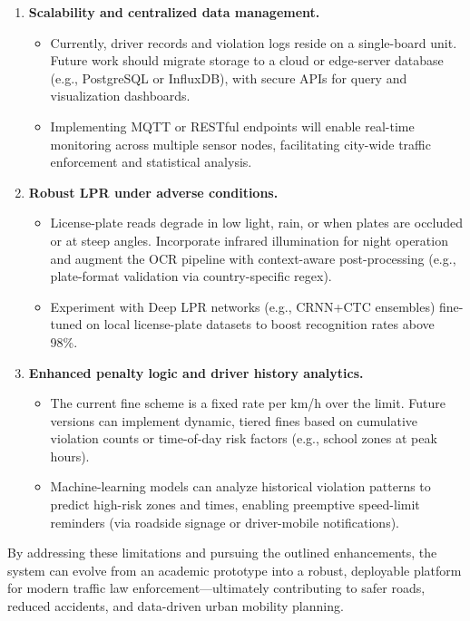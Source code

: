 \begin{enumerate}
  \item \textbf{Scalability and centralized data management.}
  \begin{itemize}
    \item Currently, driver records and violation logs reside on a single-board unit. Future work should migrate storage to a cloud or edge-server database (e.g., PostgreSQL or InfluxDB), with secure APIs for query and visualization dashboards.
    \item Implementing MQTT or RESTful endpoints will enable real-time monitoring across multiple sensor nodes, facilitating city-wide traffic enforcement and statistical analysis.
  \end{itemize}
  
  \item \textbf{Robust LPR under adverse conditions.}
  \begin{itemize}
    \item License-plate reads degrade in low light, rain, or when plates are occluded or at steep angles. Incorporate infrared illumination for night operation and augment the OCR pipeline with context-aware post-processing (e.g., plate-format validation via country-specific regex).
    \item Experiment with Deep LPR networks (e.g., CRNN+CTC ensembles) fine-tuned on local license-plate datasets to boost recognition rates above 98\%.
  \end{itemize}
  
  \item \textbf{Enhanced penalty logic and driver history analytics.}
  \begin{itemize}
    \item The current fine scheme is a fixed rate per km/h over the limit. Future versions can implement dynamic, tiered fines based on cumulative violation counts or time-of-day risk factors (e.g., school zones at peak hours).
    \item Machine-learning models can analyze historical violation patterns to predict high-risk zones and times, enabling preemptive speed-limit reminders (via roadside signage or driver-mobile notifications).
  \end{itemize}
\end{enumerate}

By addressing these limitations and pursuing the outlined enhancements, the system can evolve from an academic prototype into a robust, deployable platform for modern traffic law enforcement---ultimately contributing to safer roads, reduced accidents, and data-driven urban mobility planning.
